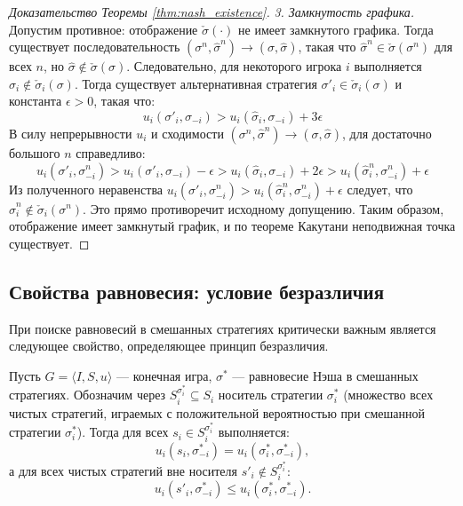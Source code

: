 \begin{proof}[Доказательство Теоремы \ref{thm:nash_existence}]
\textit{3. Замкнутость графика.} Допустим противное: отображение $\check{\sigma}(\cdot)$ не имеет замкнутого графика. Тогда существует последовательность $(\sigma^n, \hat{\sigma}^n) \to (\sigma, \hat{\sigma})$, такая что $\hat{\sigma}^n \in \check{\sigma}(\sigma^n)$ для всех $n$, но $\hat{\sigma} \notin \check{\sigma}(\sigma)$.
Следовательно, для некоторого игрока $i$ выполняется $\hat{\sigma}_i \notin \check{\sigma}_i(\sigma)$.
Тогда существует альтернативная стратегия $\sigma'_i \in \check{\sigma}_i(\sigma)$ и константа $\epsilon > 0$, такая что:
\begin{equation}
    u_i(\sigma'_i, \sigma_{-i}) > u_i(\hat{\sigma}_i, \sigma_{-i}) + 3\epsilon
\end{equation}
В силу непрерывности $u_i$ и сходимости $(\sigma^n, \hat{\sigma}^n) \to (\sigma, \hat{\sigma})$, для достаточно большого $n$ справедливо:
\begin{equation}
    u_i(\sigma'_i, \sigma^n_{-i}) > u_i(\sigma'_i, \sigma_{-i}) - \epsilon > u_i(\hat{\sigma}_i, \sigma_{-i}) + 2\epsilon > u_i(\hat{\sigma}^n_i, \sigma^n_{-i}) + \epsilon
\end{equation}
Из полученного неравенства $u_i(\sigma'_i, \sigma^n_{-i}) > u_i(\hat{\sigma}^n_i, \sigma^n_{-i}) + \epsilon$ следует, что $\hat{\sigma}^n_i \notin \check{\sigma}_i(\sigma^n)$. Это прямо противоречит исходному допущению. Таким образом, отображение имеет замкнутый график, и по теореме Какутани неподвижная точка существует.
\end{proof}

\subsection{Свойства равновесия: условие безразличия}

При поиске равновесий в смешанных стратегиях критически важным является следующее свойство, определяющее принцип безразличия.

\begin{lemma}\label{lem:indifference}
Пусть $G = \langle I, S, u \rangle$ — конечная игра, $\sigma^*$ — равновесие Нэша в смешанных стратегиях. Обозначим через $S_i^{\sigma_i^*} \subseteq S_i$ носитель стратегии $\sigma_i^*$ (множество всех чистых стратегий, играемых с положительной вероятностью при смешанной стратегии $\sigma_i^*$). Тогда для всех $s_i \in S_i^{\sigma_i^*}$ выполняется:
\begin{equation}
    u_i(s_i, \sigma^*_{-i}) = u_i(\sigma^*_i, \sigma^*_{-i}),
\end{equation}
а для всех чистых стратегий вне носителя $s'_i \notin S_i^{\sigma_i^*}$:
\begin{equation}
    u_i(s'_i, \sigma^*_{-i}) \le u_i(\sigma^*_i, \sigma^*_{-i}).
\end{equation}
\end{lemma}

